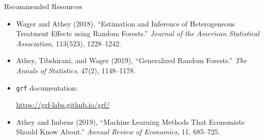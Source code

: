 \documentclass[hyperref={pdfpagelabels=false}]{beamer}
\begin{document}

\begin{frame}{Recommended Resources}
\begin{itemize}
  \item Wager and Athey (2018), ``Estimation and Inference of Heterogeneous Treatment Effects using Random Forests.'' 
  \textit{Journal of the American Statistical Association}, 113(523), 1228--1242.
  \vspace{0.2cm}

  \item Athey, Tibshirani, and Wager (2019), ``Generalized Random Forests.'' 
  \textit{The Annals of Statistics}, 47(2), 1148--1178.
  \vspace{0.2cm}

  \item \texttt{grf} documentation:
  \begin{center}
    \url{https://grf-labs.github.io/grf/}
  \end{center}
  \vspace{0.2cm}

  \item Athey and Imbens (2019), ``Machine Learning Methods That Economists Should Know About.'' 
  \textit{Annual Review of Economics}, 11, 685--725.
\end{itemize}
\end{frame}
\end{document}
